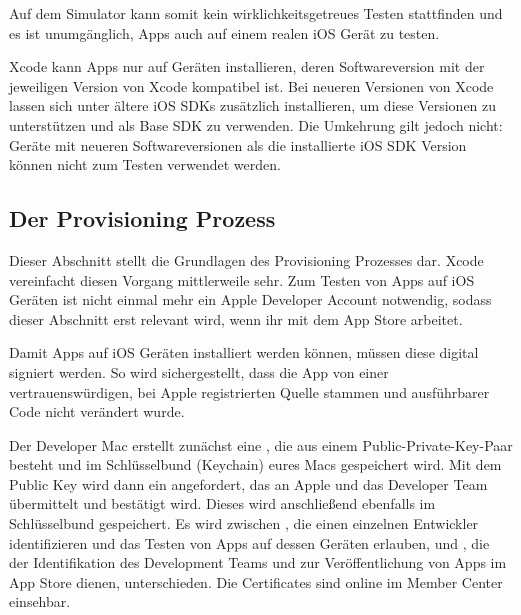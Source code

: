 \documentclass[parskip=half, final]{scrreprt}
\begin{document}

Auf dem Simulator kann somit kein wirklichkeitsgetreues Testen stattfinden und es ist unumgänglich, Apps auch auf einem realen iOS Gerät zu testen.

Xcode kann Apps nur auf Geräten installieren, deren Softwareversion mit der jeweiligen Version von Xcode kompatibel ist. Bei neueren Versionen von Xcode lassen sich unter  ältere iOS SDKs zusätzlich installieren, um diese Versionen zu unterstützen und als Base SDK  zu verwenden. Die Umkehrung gilt jedoch nicht: Geräte mit neueren Softwareversionen als die installierte iOS SDK Version können nicht zum Testen verwendet werden.


\subsection{Der Provisioning Prozess}\label{sec:provisioning}

 Dieser Abschnitt stellt die Grundlagen des Provisioning Prozesses dar. Xcode vereinfacht diesen Vorgang mittlerweile sehr. Zum Testen von Apps auf iOS Geräten ist nicht einmal mehr ein Apple Developer Account notwendig, sodass dieser Abschnitt erst relevant wird, wenn ihr mit dem App Store arbeitet.

Damit Apps auf iOS Geräten installiert werden können, müssen diese digital signiert werden. So wird sichergestellt, dass die App von einer vertrauenswürdigen, bei Apple registrierten Quelle stammen und ausführbarer Code nicht verändert wurde.

Der Developer Mac erstellt zunächst eine , die aus einem Public-Private-Key-Paar besteht und im Schlüsselbund (Keychain) eures Macs gespeichert wird. Mit dem Public Key wird dann ein  angefordert, das an Apple und das Developer Team übermittelt und bestätigt wird. Dieses wird anschließend ebenfalls im Schlüsselbund gespeichert. Es wird zwischen , die einen einzelnen Entwickler identifizieren und das Testen von Apps auf dessen Geräten erlauben, und , die der Identifikation des Development Teams und zur Veröffentlichung von Apps im App Store dienen, unterschieden. Die Certificates sind online im Member Center  einsehbar.
\end{document}
